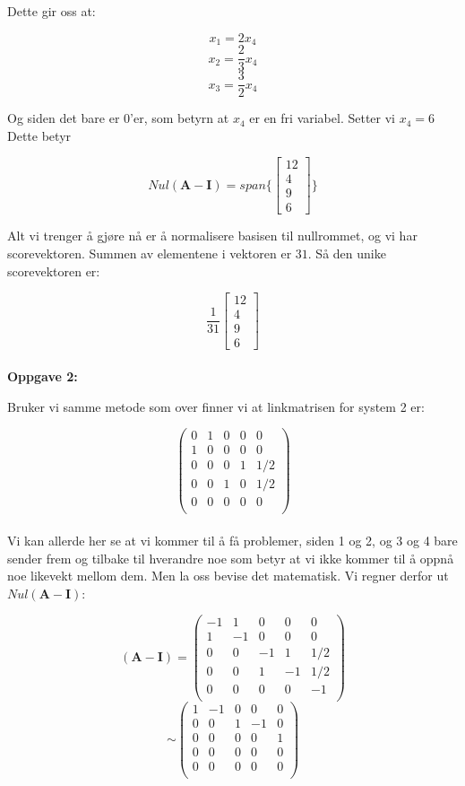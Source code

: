 \documentclass[a4paper,norsk,11pt,twoside]{article}
\begin{document}
Dette gir oss at:

$$
x_1 = 2x_4
$$
$$
x_2 = \frac{2}{3}x_4
$$
$$
x_3 = \frac{3}{2}x_4
$$

Og siden det bare er 0'er, som betyrn at $x_4$ er en fri variabel. Setter vi $x_4 = 6$ Dette betyr

$$
Nul(\textbf{A} -\textbf{I}) = span\{ \begin{bmatrix}
12 \\ 4 \\ 9 \\ 6
\end{bmatrix} \}
$$

Alt vi trenger å gjøre nå er å normalisere basisen til nullrommet, og vi har scorevektoren. Summen av elementene i vektoren er $31$. Så den unike scorevektoren er:

$$
\frac{1}{31} \begin{bmatrix}
12 \\ 4 \\ 9 \\ 6
\end{bmatrix}
$$\\


\textbf{Oppgave 2:}

Bruker vi samme metode som over finner vi at linkmatrisen for system 2 er:

$$
\begin{pmatrix}
0 & 1 & 0 & 0 & 0\\
1 & 0 & 0 & 0 & 0\\
0 & 0 & 0 & 1 & 1/2\\
0 & 0 & 1 & 0 & 1/2\\
0 & 0 & 0 & 0 & 0\\
\end{pmatrix}
$$\\

Vi kan allerde her se at vi kommer til å få problemer, siden 1 og 2, og 3 og 4 bare sender frem og tilbake til hverandre noe som betyr at vi ikke kommer til å oppnå noe likevekt mellom dem. Men la oss bevise det matematisk. Vi regner derfor ut $Nul(\textbf{A}-\textbf{I})$:

$$
(\textbf{A}-\textbf{I}) = 
\begin{pmatrix}
-1 & 1 & 0 & 0 & 0\\
1 & -1 & 0 & 0 & 0\\
0 & 0 & -1 & 1 & 1/2\\
0 & 0 & 1 & -1 & 1/2\\
0 & 0 & 0 & 0 & -1\\
\end{pmatrix}
$$
$$
\sim
\begin{pmatrix}
1 & -1 & 0 & 0 & 0\\
0 & 0 & 1 & -1 & 0\\
0 & 0 & 0 & 0 & 1\\
0 & 0 & 0 & 0 & 0\\
0 & 0 & 0 & 0 & 0\\
\end{pmatrix}
$$
\end{document}
